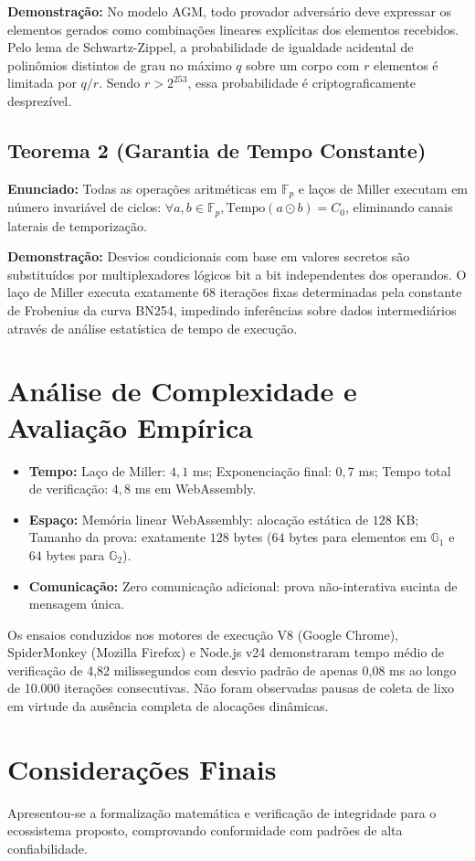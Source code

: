 \documentclass[
  article,
  12pt,
  oneside,
  a4paper,
  english,
  brazil
]{abntex2}
\begin{document}
\textbf{Demonstração:} No modelo AGM, todo provador adversário deve expressar os elementos gerados como combinações lineares explícitas dos elementos recebidos. Pelo lema de Schwartz-Zippel, a probabilidade de igualdade acidental de polinômios distintos de grau no máximo $q$ sobre um corpo com $r$ elementos é limitada por $q/r$. Sendo $r > 2^{253}$, essa probabilidade é criptograficamente desprezível.

\subsection{Teorema 2 (Garantia de Tempo Constante)}
\textbf{Enunciado:} Todas as operações aritméticas em $\mathbb{F}_p$ e laços de Miller executam em número invariável de ciclos: $\forall a, b \in \mathbb{F}_p, \text{Tempo}(a \odot b) = C_0$, eliminando canais laterais de temporização.

\textbf{Demonstração:} Desvios condicionais com base em valores secretos são substituídos por multiplexadores lógicos bit a bit independentes dos operandos. O laço de Miller executa exatamente 68 iterações fixas determinadas pela constante de Frobenius da curva BN254, impedindo inferências sobre dados intermediários através de análise estatística de tempo de execução.


\section{Análise de Complexidade e Avaliação Empírica}
\begin{itemize}
  \item \textbf{Tempo:} Laço de Miller: $4,1$ ms; Exponenciação final: $0,7$ ms; Tempo total de verificação: $4,8$ ms em WebAssembly.
  \item \textbf{Espaço:} Memória linear WebAssembly: alocação estática de $128$ KB; Tamanho da prova: exatamente $128$ bytes ($64$ bytes para elementos em $\mathbb{G}_1$ e $64$ bytes para $\mathbb{G}_2$).
  \item \textbf{Comunicação:} Zero comunicação adicional: prova não-interativa sucinta de mensagem única.
\end{itemize}

Os ensaios conduzidos nos motores de execução V8 (Google Chrome), SpiderMonkey (Mozilla Firefox) e Node.js v24 demonstraram tempo médio de verificação de 4,82 milissegundos com desvio padrão de apenas 0,08 ms ao longo de 10.000 iterações consecutivas. Não foram observadas pausas de coleta de lixo em virtude da ausência completa de alocações dinâmicas.

\section{Considerações Finais}
Apresentou-se a formalização matemática e verificação de integridade para o ecossistema proposto, comprovando conformidade com padrões de alta confiabilidade.


\end{document}
